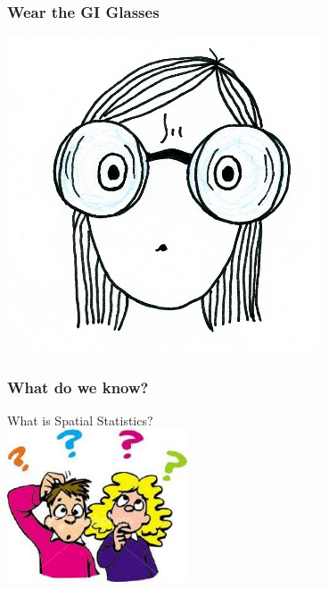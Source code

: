 \documentclass{beamer}
\begin{document}

\begin{frame}
\frametitle{Wear the GI Glasses}
\centering
\includegraphics[width=0.7\textwidth]{Figures/GIglass.png}
\end{frame}


\begin{frame}
\frametitle{What do we know?}
\centering
\Huge \alert{What is Spatial Statistics?}\\
\vspace{1cm}
\includegraphics[width=0.4\textwidth]{Figures/Questions.png}
\end{frame}

\end{document}
